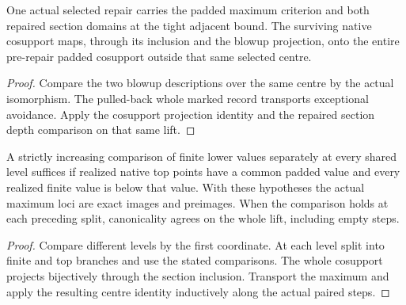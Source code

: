 \begin{theorem}
\label{hir:g1-same-special-repair-comparisons}
\leanok
One actual selected repair carries the padded maximum criterion
and both repaired section domains at the tight adjacent bound.
The surviving native cosupport maps, through its inclusion and
the blowup projection, onto the entire pre-repair padded
cosupport outside that same selected centre.
\end{theorem}
\begin{proof}
Compare the two blowup descriptions over the same centre by the
actual isomorphism. The pulled-back whole marked record transports
exceptional avoidance. Apply the cosupport projection identity
and the repaired section depth comparison on that same lift.
\end{proof}

\begin{theorem}
\label{hir:g1-normal-centre-branch-comparison}
\leanok
A strictly increasing comparison of finite lower values separately
at every shared level suffices if realized native top points have
a common padded value and every realized finite value is below
that value. With these hypotheses the actual maximum loci are
exact images and preimages. When the comparison holds at each
preceding split, canonicality agrees on the whole lift, including
empty steps.
\end{theorem}
\begin{proof}
Compare different levels by the first coordinate. At each level
split into finite and top branches and use the stated comparisons.
The whole cosupport projects bijectively through the section
inclusion. Transport the maximum and apply the resulting centre
identity inductively along the actual paired steps.
\end{proof}



